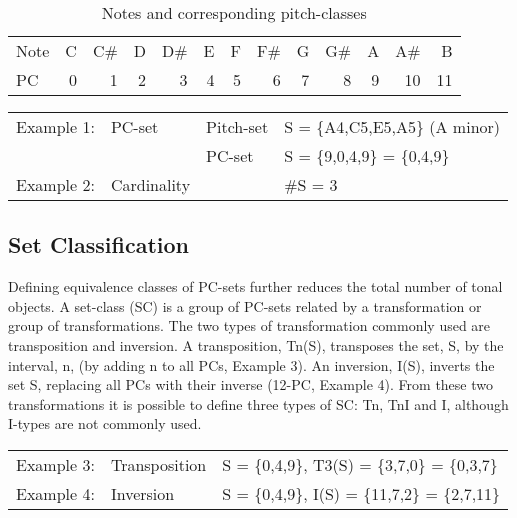 \documentclass{article}
\begin{document}
\begin{table}[htb]
\caption{Notes and corresponding pitch-classes} 
\begin{center}
\begin{tabular}{lrrrrrrrrrrrr}
 Note  &  C  &  C\#  &  D  &  D\#  &  E  &  F  &  F\#  &  G  &  G\#  &  A  &  A\#  &   B  \\
 PC    &  0  &    1  &  2  &    3  &  4  &  5  &    6  &  7  &    8  &  9  &   10  &  11  \\
\end{tabular}
\end{center}
\end{table}



\begin{center}
\begin{tabular}{llll}
 Example 1:  &  PC-set       &  Pitch-set  &  S = \{A4,C5,E5,A5\} (A minor)  \\
             &               &  PC-set     &  S = \{9,0,4,9\} = \{0,4,9\}    \\
 Example 2:  &  Cardinality  &             &  \#S = 3                        \\
\end{tabular}
\end{center}
\subsection{Set Classification}
\label{sec-3-2}

Defining equivalence classes of PC-sets further reduces the total
number of tonal objects. A set-class (SC) is a group of PC-sets
related by a transformation or group of transformations. The two types
of transformation commonly used are transposition and inversion. A
transposition, Tn(S), transposes the set, S, by the interval, n, (by
adding n to all PCs, Example 3). An inversion, I(S), inverts the set
S, replacing all PCs with their inverse (12-PC, Example 4). From these
two transformations it is possible to define three types of SC: Tn,
TnI and I, although I-types are not commonly used.


\begin{center}
\begin{tabular}{lll}
 Example 3:  &  Transposition  &  S = \{0,4,9\}, T3(S) = \{3,7,0\} = \{0,3,7\}   \\
 Example 4:  &  Inversion      &  S = \{0,4,9\}, I(S) = \{11,7,2\} = \{2,7,11\}  \\
\end{tabular}
\end{center}
\end{document}
